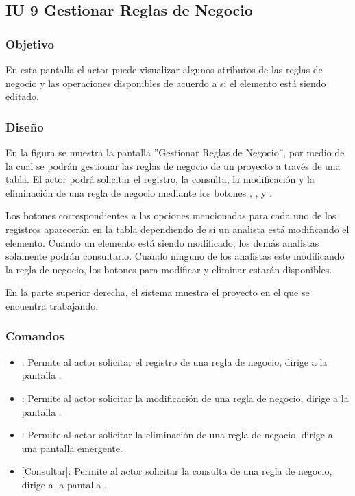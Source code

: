 \subsection{IU 9 Gestionar Reglas de Negocio}

\subsubsection{Objetivo}
	En esta pantalla el actor puede visualizar algunos atributos de las reglas de negocio y las operaciones disponibles de acuerdo a si el elemento está siendo editado.
\subsubsection{Diseño}
	En la figura  se muestra la pantalla ''Gestionar Reglas de Negocio'', por medio de la cual se podrán gestionar las reglas de negocio de un proyecto a través de una tabla. El actor podrá solicitar el registro, la consulta, la modificación y la eliminación de una regla de negocio mediante los botones , , \editar y \eliminar.
	
	Los botones correspondientes a las opciones mencionadas para cada uno de los registros aparecerán en la tabla dependiendo de si un analista está modificando el elemento. Cuando un elemento está siendo modificado, los demás analistas solamente podrán consultarlo. Cuando ninguno de los analistas este modificando la regla de negocio, los botones para modificar y eliminar estarán disponibles.
	
	En la parte superior derecha, el sistema muestra el proyecto en el que se encuentra trabajando.

\subsubsection{Comandos}
\begin{itemize}
	\item {}: Permite al actor solicitar el registro de una regla de negocio, dirige a la pantalla .
	\item \editar [Modificar]: Permite al actor solicitar la modificación de una regla de negocio, dirige a la pantalla .
	\item \eliminar [Eliminar]: Permite al actor solicitar la eliminación de una regla de negocio, dirige a una pantalla emergente.
	\item {} [Consultar]: Permite al actor solicitar la consulta de una regla de negocio, dirige a la pantalla  .
\end{itemize}
